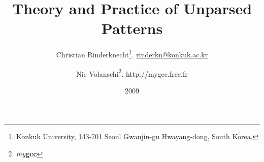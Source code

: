 \documentclass[11pt,a4paper]{article}
\title{Theory and Practice of Unparsed Patterns}
\author{%
  Christian Rinderknecht\thanks{Konkuk University, 143-701 Seoul Gwanjin-gu Hwayang-dong, South Korea.}. \url{rinderkn@konkuk.ac.kr}
  \and
  Nic Volanschi\thanks{\emph{my}\textbf{gcc}}. \url{http://mygcc.free.fr}
}
\date{2009}
\begin{document}
\maketitle



\allowdisplaybreaks












\end{document}
